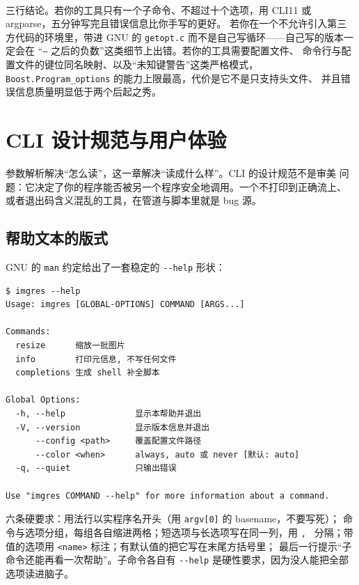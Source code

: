 \documentclass[12pt,a4paper,fontset=fandol]{ctexbook}
\newcommand{\Tp}[1]{\texttt{#1}}
\newcommand{\Opt}[1]{\texttt{-\/-#1}}
\newcommand{\Bk}{\allowbreak}
\begin{document}
\begin{bestpractice}[title={怎么选}]\mbox{}\\
三行结论。若你的工具只有一个子命令、不超过十个选项，用
CLI11 或 argparse，五分钟写完且错误信息比你手写的更好。
若你在一个不允许引入第三方代码的环境里，带进 GNU 的
\Tp{getopt.c} 而不是自己写循环——自己写的版本一定会在
``\Tp{--} 之后的负数''这类细节上出错。若你的工具需要配置文件、
命令行与配置文件的键位同名映射、以及``未知键警告''这类严格模式，
\Tp{Boost\Bk.Program\Bk\_options} 的能力上限最高，代价是它不是只支持头文件、
并且错误信息质量明显低于两个后起之秀。
\end{bestpractice}

\chapter{CLI 设计规范与用户体验}

参数解析解决``怎么读''，这一章解决``读成什么样''。CLI 的设计规范不是审美
问题：它决定了你的程序能否被另一个程序安全地调用。一个不打印到正确流上、
或者退出码含义混乱的工具，在管道与脚本里就是 bug 源。

\section{帮助文本的版式}

GNU 的 \Tp{man} 约定给出了一套稳定的 \Opt{help} 形状：

\begin{lstlisting}[style=shellstyle,caption={一个合规的 --help 输出骨架}]
$ imgres --help
Usage: imgres [GLOBAL-OPTIONS] COMMAND [ARGS...]

Commands:
  resize      缩放一批图片
  info        打印元信息, 不写任何文件
  completions 生成 shell 补全脚本

Global Options:
  -h, --help              显示本帮助并退出
  -V, --version           显示版本信息并退出
      --config <path>     覆盖配置文件路径
      --color <when>      always, auto 或 never [默认: auto]
  -q, --quiet             只输出错误

Use "imgres COMMAND --help" for more information about a command.
\end{lstlisting}

六条硬要求：用法行以实程序名开头（用 \Tp{argv[0]} 的 basename，不要写死）；
命令与选项分组，每组各自缩进两格；短选项与长选项写在同一列，用
\Tp{, } 分隔；带值的选项用 \Tp{<name>} 标注；有默认值的把它写在末尾方括号里；
最后一行提示``子命令还能再看一次帮助''。子命令各自有 \Opt{help}
是硬性要求，因为没人能把全部选项读进脑子。
\end{document}
